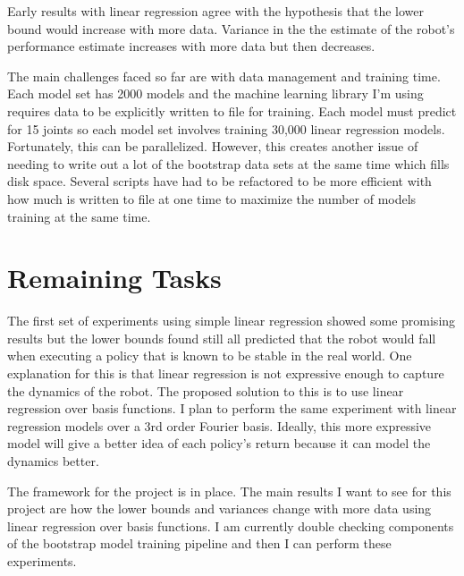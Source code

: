\documentclass[12 pt,two column]{article}
\begin{document}
Early results with linear regression agree with the hypothesis that the lower bound would increase with more data. Variance in the the estimate of the robot's performance estimate increases with more data but then decreases.

The main challenges faced so far are with data management and training time. Each model set has 2000 models and the machine learning library I'm using requires data to be explicitly written to file for training. Each model must predict for 15 joints so each model set involves training 30,000 linear regression models. Fortunately, this can be parallelized. However, this creates another issue of needing to write out a lot of the bootstrap data sets at the same time which fills disk space. Several scripts have had to be refactored to be more efficient with how much is written to file at one time to maximize the number of models training at the same time.

\section{Remaining Tasks}
The first set of experiments using simple linear regression showed some promising results but the lower bounds found still all predicted that the robot would fall when executing a policy that is known to be stable in the real world. One explanation for this is that linear regression is not expressive enough to capture the dynamics of the robot. The proposed solution to this is to use linear regression over basis functions. I plan to perform the same experiment with linear regression models over a 3rd order Fourier basis. Ideally, this more expressive model will give a better idea of each policy's return because it can model the dynamics better.

The framework for the project is in place. The main results I want to see for this project are how the lower bounds and variances change with more data using linear regression over basis functions. I am currently double checking components of the bootstrap model training pipeline and then I can perform these experiments.



\end{document}
